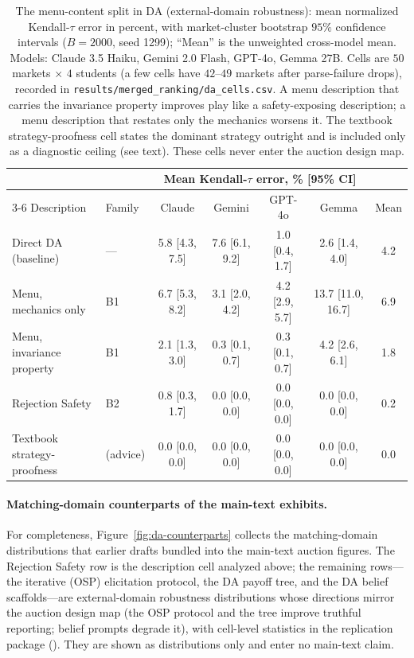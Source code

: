 \begin{table}[htbp]
\centering
\footnotesize
\setlength{\tabcolsep}{4pt}
\begin{tabular}{llccccc}
\toprule
& & \multicolumn{4}{c}{Mean Kendall-$\tau$ error, \% [95\% CI]} & \\
\cmidrule(lr){3-6}
Description & Family & Claude & Gemini & GPT-4o & Gemma & Mean \\
\midrule
Direct DA (baseline) & --- & 5.8 [4.3, 7.5] & 7.6 [6.1, 9.2] & 1.0 [0.4, 1.7] & 2.6 [1.4, 4.0] & 4.2 \\
\addlinespace
Menu, mechanics only & B1 & 6.7 [5.3, 8.2] & 3.1 [2.0, 4.2] & 4.2 [2.9, 5.7] & 13.7 [11.0, 16.7] & 6.9 \\
Menu, invariance property & B1 & 2.1 [1.3, 3.0] & 0.3 [0.1, 0.7] & 0.3 [0.1, 0.7] & 4.2 [2.6, 6.1] & 1.8 \\
Rejection Safety & B2 & 0.8 [0.3, 1.7] & 0.0 [0.0, 0.0] & 0.0 [0.0, 0.0] & 0.0 [0.0, 0.0] & 0.2 \\
Textbook strategy-proofness & (advice) & 0.0 [0.0, 0.0] & 0.0 [0.0, 0.0] & 0.0 [0.0, 0.0] & 0.0 [0.0, 0.0] & 0.0 \\
\bottomrule
\end{tabular}
\caption{The menu-content split in DA (external-domain robustness): mean normalized Kendall-$\tau$ error in percent, with market-cluster bootstrap $95\%$ confidence intervals ($B = 2000$, seed 1299); ``Mean'' is the unweighted cross-model mean. Models: Claude 3.5 Haiku, Gemini 2.0 Flash, GPT-4o, Gemma 27B. Cells are $50$ markets $\times$ $4$ students (a few cells have $42$--$49$ markets after parse-failure drops), recorded in \texttt{results/merged\_ranking/da\_cells.csv}. A menu description that carries the invariance property improves play like a safety-exposing description; a menu description that restates only the mechanics worsens it. The textbook strategy-proofness cell states the dominant strategy outright and is included only as a diagnostic ceiling (see text). These cells never enter the auction design map.}
\label{tab:da-descriptions}
\end{table}

\paragraph{Matching-domain counterparts of the main-text exhibits.}
For completeness, Figure~\ref{fig:da-counterparts} collects the matching-domain distributions that earlier drafts bundled into the main-text auction figures. The Rejection Safety row is the description cell analyzed above; the remaining rows---the iterative (OSP) elicitation protocol, the DA payoff tree, and the DA belief scaffolds---are external-domain robustness distributions whose directions mirror the auction design map (the OSP protocol and the tree improve truthful reporting; belief prompts degrade it), with cell-level statistics in the replication package (). They are shown as distributions only and enter no main-text claim.


